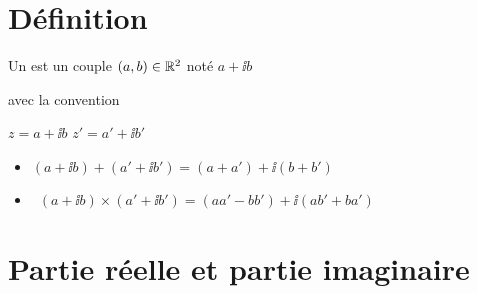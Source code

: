\section{Définition}

\begin{frame}
  Un  est un couple $(a, b) \in \mathbb{R}^2$
  noté $a + \ii b$ 

\pause

avec la convention 

\pause



\pause

\qquad $z = a + \ii b$ \qquad $z' = a' + \ii b'$ 
\begin{itemize}
  \item {} \quad  $(a + \ii b) + (a' + \ii b') = 
(a + a') + \ii  (b + b')$ 
\pause \pause
  \item {} \  $(a + \ii b) \times (a' + \ii b')
  = (aa' - bb') + \ii  (ab' + ba')$
\end{itemize}
\end{frame}


\section{Partie réelle et partie imaginaire}

